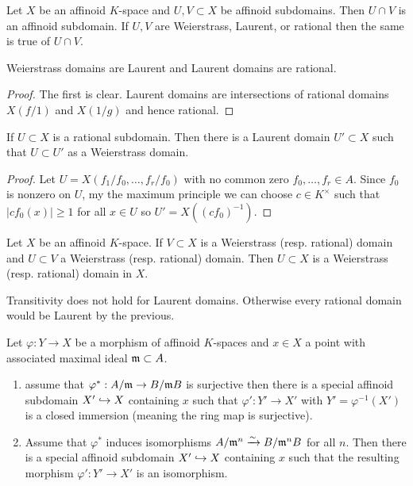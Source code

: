 \documentclass[12pt]{article}
\begin{document}
\begin{prop}
Let $X$ be an affinoid $K$-space and $U, V \subset X$ be affinoid subdomains. Then $U \cap V$ is an affinoid subdomain. If $U, V$ are Weierstrass, Laurent, or rational then the same is true of $U \cap V$.
\end{prop}

\begin{cor}
Weierstrass domains are Laurent and Laurent domains are rational.
\end{cor}

\begin{proof}
The first is clear. Laurent domains are intersections of rational domains $X(f/1)$ and $X(1/g)$ and hence rational.
\end{proof}

\begin{prop} 
If $U \subset X$ is a rational subdomain. Then there is a Laurent domain $U' \subset X$ such that $U \subset U'$ as a Weierstrass domain.
\end{prop}

\begin{proof}
Let $U = X(f_1/f_0, \dots, f_r/f_0)$ with no common zero $f_0, \dots, f_r \in A$. Since $f_0$ is nonzero on $U$, my the maximum principle we can choose $c \in K^\times$ such that $|c f_0(x)| \ge 1$ for all $x \in U$ so $U' = X((cf_0)^{-1})$.
\end{proof}

\begin{prop}
Let $X$ be an affinoid $K$-space. If $V \subset X$ is a Weierstrass (resp. rational) domain and $U \subset V$ a Weierstrass (resp. rational) domain. Then $U \subset X$ is a Weierstrass (resp. rational) domain in $X$.
\end{prop}

\begin{rmk}
Transitivity does not hold for Laurent domains. Otherwise every rational domain would be Laurent by the previous.
\end{rmk}

\begin{lemma}
Let $\varphi : Y \to X$ be a morphism of affinoid $K$-spaces and $x \in X$ a point with associated maximal ideal $\mathfrak{m} \subset A$. 
\begin{enumerate}
\item assume that $\varphi^* : A / \mathfrak{m} \to B / \mathfrak{m} B$ is surjective then there is a special affinoid subdomain $X' \hookrightarrow X$ containing $x$ such that $\varphi' : Y' \to X'$ with $Y' = \varphi^{-1}(X')$ is a closed immersion (meaning the ring map is surjective). 

\item Assume that $\varphi^*$ induces isomorphisms $A / \mathfrak{m}^n \xrightarrow{\sim} B / \mathfrak{m}^n B$ for all $n$. Then there is a special affinoid subdomain $X' \hookrightarrow X$ containing $x$ such that the resulting morphism $\varphi' : Y' \to X'$ is an isomorphism. 
\end{enumerate}
\end{lemma}
\end{document}
